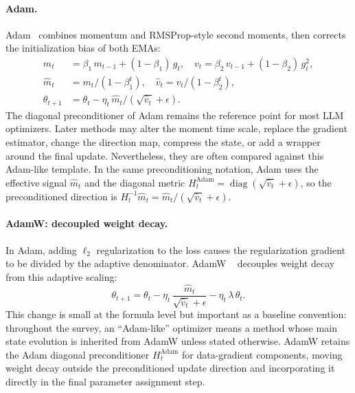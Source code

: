 \paragraph{Adam.}
Adam~\cite{kingma2015adam} combines momentum and RMSProp-style second moments,
then corrects the initialization bias of both EMAs:
\begin{align}
  m_t &= \beta_1\,m_{t-1}+(1-\beta_1)\,g_t,\quad v_t = \beta_2\,v_{t-1}+(1-\beta_2)\,g_t^2,
  \label{eq:adam-moments}\\
  \hat{m}_t &= m_t/(1-\beta_1^t),\quad \hat{v}_t = v_t/(1-\beta_2^t),
  \label{eq:adam-bias}\\
  \theta_{t+1} &= \theta_t - \eta_t\,\hat{m}_t/(\sqrt{\hat{v}_t}+\epsilon).
  \label{eq:adam-update}
\end{align}
The diagonal preconditioner of Adam remains the reference point for most LLM
optimizers.  Later methods may alter the moment time scale, replace the
gradient estimator, change the direction map, compress the state, or add a
wrapper around the final update.  Nevertheless, they are often compared against
this Adam-like template.
In the same preconditioning notation, Adam uses the effective signal
$\hat{m}_t$ and the diagonal metric
$H_t^{\mathrm{Adam}}=\operatorname{diag}(\sqrt{\hat{v}_t}+\epsilon)$, so the
preconditioned direction is $H_t^{-1}\hat{m}_t
=\hat{m}_t/(\sqrt{\hat{v}_t}+\epsilon)$.

\paragraph{AdamW: decoupled weight decay.}
In Adam, adding $\ell_2$ regularization to the loss causes the regularization
gradient to be divided by the adaptive denominator. AdamW
~\cite{loshchilov2019decoupled} decouples weight decay from this adaptive
scaling:
\begin{equation}
  \theta_{t+1} = \theta_t
    - \eta_t\,\frac{\hat{m}_t}{\sqrt{\hat{v}_t}+\epsilon}
    - \eta_t\,\lambda\,\theta_t .
  \label{eq:adamw}
\end{equation}
This change is small at the formula level but important as a baseline convention: throughout the survey, an ``Adam-like'' optimizer means a method whose main state evolution is inherited from AdamW unless stated otherwise.
AdamW retains the Adam diagonal preconditioner $H_t^{\mathrm{Adam}}$ for data-gradient components, moving weight decay outside the preconditioned update direction and incorporating it directly in the final parameter assignment step.

